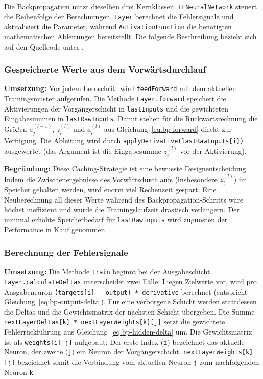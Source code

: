 Die Backpropagation nutzt dieselben drei Kernklassen. \texttt{FFNeuralNetwork} steuert die Reihenfolge der Berechnungen, \texttt{Layer} berechnet die Fehlersignale und aktualisiert die Parameter, während \texttt{ActivationFunction} die benötigten mathematischen Ableitungen bereitstellt. Die folgende Beschreibung bezieht sich auf den Quellcode unter .

\subsubsection{Gespeicherte Werte aus dem Vorwärtsdurchlauf}

\textbf{Umsetzung:} Vor jedem Lernschritt wird \texttt{feedForward} mit dem aktuellen Trainingsmuster aufgerufen. Die Methode \texttt{Layer.forward} speichert die Aktivierungen der Vorgängerschicht in \texttt{lastInputs} und die gewichteten Eingabesummen in \texttt{lastRawInputs}. Damit stehen für die Rückwärtsrechnung die Größen $a_j^{(l-1)}$, $z_i^{(l)}$ und $a_i^{(l)}$ aus Gleichung~\eqref{eq:bp-forward} direkt zur Verfügung. Die Ableitung wird durch \texttt{applyDerivative(lastRawInputs[i])} ausgewertet (das Argument ist die Eingabesumme $z_i^{(l)}$ vor der Aktivierung).

\textbf{Begründung:} Diese Caching-Strategie ist eine bewusste Designentscheidung. Indem die Zwischenergebnisse des Vorwärtsdurchlaufs (insbesondere $z_i^{(l)}$) im Speicher gehalten werden, wird enorm viel Rechenzeit gespart. Eine Neuberechnung all dieser Werte während des Backpropagation-Schritts wäre höchst ineffizient und würde die Trainingslaufzeit drastisch verlängern. Der minimal erhöhte Speicherbedarf für \texttt{lastRawInputs} wird zugunsten der Performance in Kauf genommen.

\subsubsection{Berechnung der Fehlersignale}

\textbf{Umsetzung:} Die Methode \texttt{train} beginnt bei der Ausgabeschicht. \texttt{Layer.calculateDeltas} unterscheidet zwei Fälle: Liegen Zielwerte vor, wird pro Ausgabeneuron \texttt{(targets[i] - output) * derivative} berechnet (entspricht Gleichung~\eqref{eq:bp-output-delta}). Für eine verborgene Schicht werden stattdessen die Deltas und die Gewichtsmatrix der nächsten Schicht übergeben. Die Summe \texttt{nextLayerDeltas[k] * nextLayerWeights[k][j]} setzt die gewichtete Fehlerrückführung aus Gleichung~\eqref{eq:bp-hidden-delta} um. Die Gewichtsmatrix ist als \texttt{weights[i][j]} aufgebaut: Der erste Index (\texttt{i}) bezeichnet das aktuelle Neuron, der zweite (\texttt{j}) ein Neuron der Vorgängerschicht. \texttt{nextLayerWeights[k][j]} bezeichnet somit die Verbindung vom aktuellen Neuron \texttt{j} zum nachfolgenden Neuron \texttt{k}.

